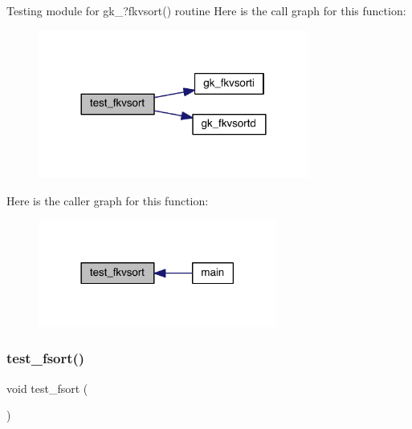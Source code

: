 Testing module for gk\+\_\+?fkvsort() routine Here is the call graph for this function\+:\nopagebreak
\begin{figure}[H]
\begin{center}
\leavevmode
\includegraphics[width=252pt]{a00152_a179814629e9b2ff14387734d6ac52a38_cgraph}
\end{center}
\end{figure}
Here is the caller graph for this function\+:\nopagebreak
\begin{figure}[H]
\begin{center}
\leavevmode
\includegraphics[width=222pt]{a00152_a179814629e9b2ff14387734d6ac52a38_icgraph}
\end{center}
\end{figure}
\mbox{\label{a00152_a92bfe9a7c6bec5eab568c71eda7eb1f1}} 
\subsubsection{\texorpdfstring{test\+\_\+fsort()}{test\_fsort()}}
{\footnotesize\ttfamily void test\+\_\+fsort (\begin{DoxyParamCaption}{ }\end{DoxyParamCaption})}

